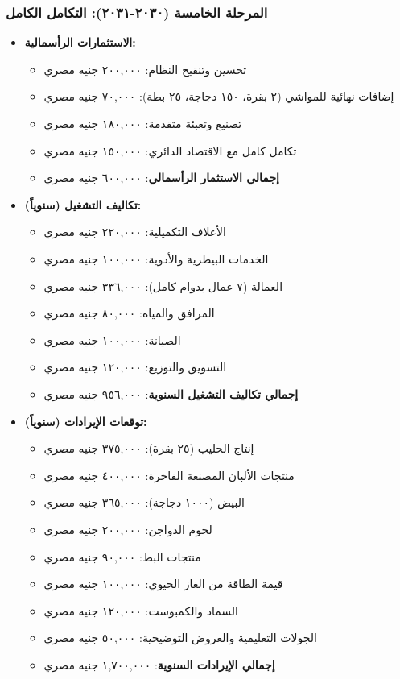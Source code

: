\subsubsection{المرحلة الخامسة (٢٠٣٠-٢٠٣١): التكامل الكامل}
\begin{itemize}
    \item \textbf{الاستثمارات الرأسمالية:}
    \begin{itemize}
        \item تحسين وتنقيح النظام: ٢٠٠,٠٠٠ جنيه مصري
        \item إضافات نهائية للمواشي (٢ بقرة، ١٥٠ دجاجة، ٢٥ بطة): ٧٠,٠٠٠ جنيه مصري
        \item تصنيع وتعبئة متقدمة: ١٨٠,٠٠٠ جنيه مصري
        \item تكامل كامل مع الاقتصاد الدائري: ١٥٠,٠٠٠ جنيه مصري
        \item \textbf{إجمالي الاستثمار الرأسمالي}: ٦٠٠,٠٠٠ جنيه مصري
    \end{itemize}
    
    \item \textbf{تكاليف التشغيل (سنوياً):}
    \begin{itemize}
        \item الأعلاف التكميلية: ٢٢٠,٠٠٠ جنيه مصري
        \item الخدمات البيطرية والأدوية: ١٠٠,٠٠٠ جنيه مصري
        \item العمالة (٧ عمال بدوام كامل): ٣٣٦,٠٠٠ جنيه مصري
        \item المرافق والمياه: ٨٠,٠٠٠ جنيه مصري
        \item الصيانة: ١٠٠,٠٠٠ جنيه مصري
        \item التسويق والتوزيع: ١٢٠,٠٠٠ جنيه مصري
        \item \textbf{إجمالي تكاليف التشغيل السنوية}: ٩٥٦,٠٠٠ جنيه مصري
    \end{itemize}
    
    \item \textbf{توقعات الإيرادات (سنوياً):}
    \begin{itemize}
        \item إنتاج الحليب (٢٥ بقرة): ٣٧٥,٠٠٠ جنيه مصري
        \item منتجات الألبان المصنعة الفاخرة: ٤٠٠,٠٠٠ جنيه مصري
        \item البيض (١٠٠٠ دجاجة): ٣٦٥,٠٠٠ جنيه مصري
        \item لحوم الدواجن: ٢٠٠,٠٠٠ جنيه مصري
        \item منتجات البط: ٩٠,٠٠٠ جنيه مصري
        \item قيمة الطاقة من الغاز الحيوي: ١٠٠,٠٠٠ جنيه مصري
        \item السماد والكمبوست: ١٢٠,٠٠٠ جنيه مصري
        \item الجولات التعليمية والعروض التوضيحية: ٥٠,٠٠٠ جنيه مصري
        \item \textbf{إجمالي الإيرادات السنوية}: ١,٧٠٠,٠٠٠ جنيه مصري
    \end{itemize}
    

\end{itemize}

